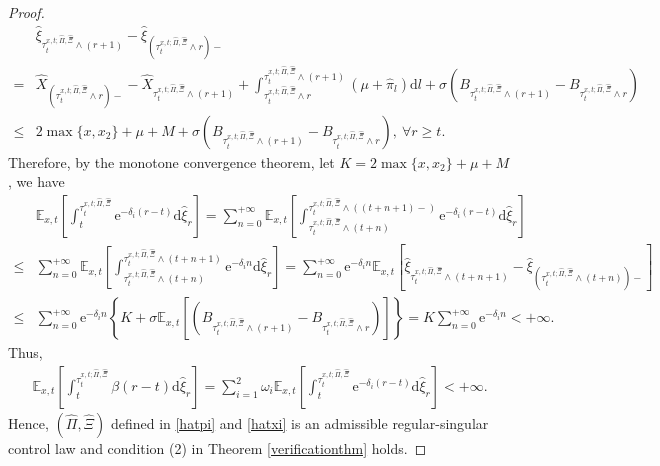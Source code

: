 \documentclass[11pt,reqno]{article}%
\numberwithin{equation}{section}
\begin{document}
\begin{proof}
\begin{equation}
\begin{aligned}
&\hat\xi_{\tau^{x,t;\hat\Pi,\hat\Xi}_{t}\wedge(r+1)}-\hat\xi_{(\tau^{x,t;\hat\Pi,\hat\Xi}_{t}\wedge r)-}\\
=&\hat{X}_{(\tau^{x,t;\hat\Pi,\hat\Xi}_{t}\wedge r)-}-\hat{X}_{\tau^{x,t;\hat\Pi,\hat\Xi}_{t}\wedge(r+1)}+\int^{\tau^{x,t;\hat\Pi,\hat\Xi}_{t}\wedge(r+1)}_{\tau^{x,t;\hat\Pi,\hat\Xi}_{t}\wedge r}\left(\mu+\hat\pi_l\right)\mathrm{d}l+\sigma\left(B_{\tau^{x,t;\hat\Pi,\hat\Xi}_{t}\wedge (r+1)}-B_{\tau^{x,t;\hat\Pi,\hat\Xi}_{t}\wedge r}\right)\\
\le &2\max\{x,x_2\}+\mu+M +\sigma \left(B_{\tau^{x,t;\hat\Pi,\hat\Xi}_{t}\wedge (r+1)}-B_{\tau^{x,t;\hat\Pi,\hat\Xi}_{t}\wedge r}\right), \ \forall r\ge t.
\end{aligned}\nonumber
\end{equation}
 Therefore, by the monotone convergence theorem, let $K=2\max\{x,x_2\}+\mu+M $, we have
\begin{equation}
\begin{aligned}
&\mathbb{E}_{x, t}\left[\int_t^{\tau^{x,t;\hat\Pi,\hat\Xi}_{t}} \mathrm{e}^{-\delta_i (r-t)}  \mathrm{d} \hat\xi_r\right]= \sum\limits_{n=0}^{+\infty}\mathbb{E}_{x, t}\left[\int^{\tau^{x,t;\hat\Pi,\hat\Xi}_{t}\wedge((t+n+1)-)}_{\tau^{x,t;\hat\Pi,\hat\Xi}_{t}\wedge(t+n)} \mathrm{e}^{-\delta_i (r-t)}  \mathrm{d} \hat\xi_r\right]\\
\le &\sum\limits_{n=0}^{+\infty}\mathbb{E}_{x, t}\left[\int^{\tau^{x,t;\hat\Pi,\hat\Xi}_{t}\wedge(t+n+1)}_{\tau^{x,t;\hat\Pi,\hat\Xi}_{t}\wedge(t+n)} \mathrm{e}^{-\delta_i n}  \mathrm{d} \hat\xi_r\right]
= \sum\limits_{n=0}^{+\infty}\mathrm{e}^{-\delta_i n}\mathbb{E}_{x, t}\left[\hat\xi_{\tau^{x,t;\hat\Pi,\hat\Xi}_{t}\wedge(t+n+1)}-\hat\xi_{(\tau^{x,t;\hat\Pi,\hat\Xi}_{t}\wedge(t+n))-}\right]\\  
\le &\sum\limits_{n=0}^{+\infty}\mathrm{e}^{-\delta_i n}\left\{K+\sigma \mathbb{E}_{x, t}\left[\left(B_{\tau^{x,t;\hat\Pi,\hat\Xi}_{t}\wedge (r+1)}-B_{\tau^{x,t;\hat\Pi,\hat\Xi}_{t}\wedge r}\right)\right]\right\}
=K\sum\limits_{n=0}^{+\infty}\mathrm{e}^{-\delta_i n}<+\infty.
\end{aligned}\nonumber
\end{equation} 
Thus, 
\begin{equation}
\begin{aligned}
\mathbb{E}_{x, t}\left[\int_t^{\tau^{x,t;\hat\Pi,\hat\Xi}_{t}} \beta(r-t)  \mathrm{d} \hat\xi_r\right]=\sum\limits_{i=1}^{2}\omega_i\mathbb{E}_{x, t}\left[\int_t^{\tau^{x,t;\hat\Pi,\hat\Xi}_{t}}  \mathrm{e}^{-\delta_i (r-t)} \mathrm{d} \hat\xi_r\right]<+\infty.
\end{aligned}\nonumber
\end{equation}
Hence, $\left(\hat\Pi,\hat\Xi\right)$ defined in \eqref{hatpi} and \eqref{hatxi} is an admissible regular-singular control law and condition (2) in Theorem \ref{verificationthm} holds.
 

\end{proof}
\end{document}
